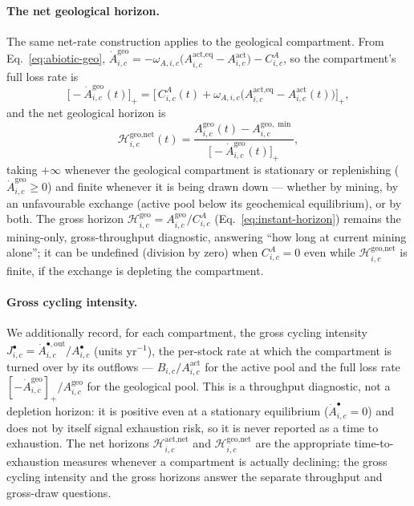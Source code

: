 \documentclass[twocolumn,10pt]{article}
\begin{document}
\paragraph{The net geological horizon.} The same net-rate construction applies to the geological compartment. From Eq.~\eqref{eq:abiotic-geo}, $\dot A^{\text{geo}}_{i,c} = -\omega_{A,i,c}\bigl(A^{\text{act,eq}}_{i,c}-A^{\text{act}}_{i,c}\bigr) - C^A_{i,c}$, so the compartment's full loss rate is
\[
\bigl[-\dot A^{\text{geo}}_{i,c}(t)\bigr]_+ = \bigl[\,C^A_{i,c}(t) + \omega_{A,i,c}\bigl(A^{\text{act,eq}}_{i,c}-A^{\text{act}}_{i,c}(t)\bigr)\bigr]_+,
\]
and the net geological horizon is
\begin{equation}
\mathcal{H}^{\text{geo,net}}_{i,c}(t) = \frac{A^{\text{geo}}_{i,c}(t) - A^{\text{geo},\min}_{i,c}}{\bigl[-\dot A^{\text{geo}}_{i,c}(t)\bigr]_+}, \label{eq:instant-horizon-geo-net}
\end{equation}
taking $+\infty$ whenever the geological compartment is stationary or replenishing ($\dot A^{\text{geo}}_{i,c}\ge0$) and finite whenever it is being drawn down --- whether by mining, by an unfavourable exchange (active pool below its geochemical equilibrium), or by both. The gross horizon $\mathcal H^{\text{geo}}_{i,c}=A^{\text{geo}}_{i,c}/C^A_{i,c}$ (Eq.~\eqref{eq:instant-horizon}) remains the mining-only, gross-throughput diagnostic, answering ``how long at current mining alone''; it can be undefined (division by zero) when $C^A_{i,c}=0$ even while $\mathcal H^{\text{geo,net}}_{i,c}$ is finite, if the exchange is depleting the compartment.

\paragraph{Gross cycling intensity.} We additionally record, for each compartment, the gross cycling intensity $J^{\bullet}_{i,c}=\dot A^{\bullet,\text{out}}_{i,c}/A^{\bullet}_{i,c}$ (units yr$^{-1}$), the per-stock rate at which the compartment is turned over by its outflows --- $B_{i,c}/A^{\text{act}}_{i,c}$ for the active pool and the full loss rate $[-\dot A^{\text{geo}}_{i,c}]_+/A^{\text{geo}}_{i,c}$ for the geological pool. This is a throughput diagnostic, not a depletion horizon: it is positive even at a stationary equilibrium ($\dot A^{\bullet}_{i,c}=0$) and does not by itself signal exhaustion risk, so it is never reported as a time to exhaustion. The net horizons $\mathcal H^{\text{act,net}}_{i,c}$ and $\mathcal H^{\text{geo,net}}_{i,c}$ are the appropriate time-to-exhaustion measures whenever a compartment is actually declining; the gross cycling intensity and the gross horizons answer the separate throughput and gross-draw questions.
\end{document}
